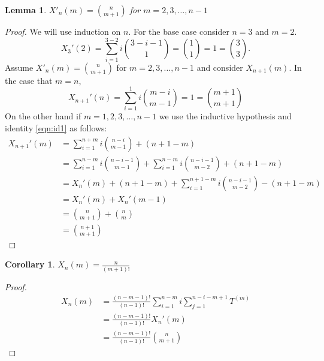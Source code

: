 \documentclass[oneside]{book} %
\newtheorem{lem}[thm]{Lemma}
\newtheorem{cor}[thm]{Corollary}
\theoremstyle{definition}
\numberwithin{equation}{section}
\begin{document}
\begin{lem}\label{lem:xdash}
 $X'_n(m) = {n\choose m+1}$ for $m = 2,3,\dots,n-1$
\end{lem}
\begin{proof}
 We will use induction on $n$.  For the base case consider $n=3$ and $m=2$.  
 \[X_3'(2) = \sum_{i=1}^{3-2} i {3-i-1\choose 1} = {1\choose 1} = 1 = {3\choose3}.
 \]
Assume $X'_n(m) = {n\choose m+1}$ for $m = 2,3,\dots,n-1$ and consider $X_{n+1}(m)$.  In the case that $m =n$,
\[ X_{n+1}'(n) = \sum_{i=1}^1 i {m-i\choose m-1}  = 1 = {m+1 \choose m+1}\]
On the other hand if $m = 1,2,3,\dots, n-1$ we use the inductive hypothesis and identity \ref{eqn:id1} as follows:
\begin{align}
 X_{n+1}'(m) &= \sum_{i=1}^{n+m} i {n-i \choose m-1} + (n+1-m)\\
	    &= \sum_{i=1}^{n-m} i {n-i -1 \choose m-1} + \sum_{i=1}^{n-m} i {n-i -1 \choose m-2} + (n+1 - m)\\
	    &= X_n'(m) + (n+1-m) + \sum_{i=1}^{n+1-m} i {n-i -1 \choose m-2} - (n+1 -m)\\
	    &= X_n'(m) + X_n'(m-1)\\
	    &= {n\choose m+1} + {n \choose m}\\
	    &= {n+1\choose m+1}	 
\end{align}
\end{proof}
\begin{cor}
 $X_n(m)  =  \frac{n}{(m+1)!}$
\end{cor}
\begin{proof}
 \begin{align}
  X_n(m) &= \frac{(n-m-1)!}{(n-1)!}\sum_{i=1}^{n-m} i \sum_{j=1}^{n-i-m+1}T^{(m)}\\
  &= \frac{(n-m-1)!}{(n-1)!}X_n'(m)\\
  &= \frac{(n-m-1)!}{(n-1)!}{n \choose m+1}
   \end{align}

\end{proof}
\end{document}

